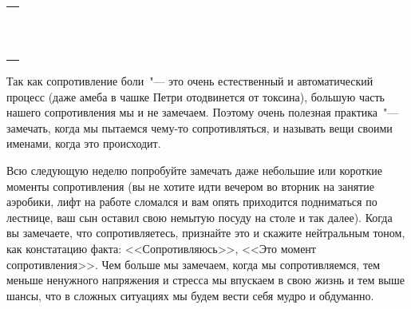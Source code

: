 \setlength{\extrarowheight}{2mm}
\begin{tabularx}{0.96\textwidth}{X}
	\\
	\arrayrulecolor{gray}\hline\\
	\hline\\
	\hline\\
	\hline\\
	\hline\\
	\hline\\
	\hline\\
	\hline\\
	\hline\\
	\hline\\
	\hline\\
	\hline\\
\end{tabularx}
\setlength{\extrarowheight}{0mm} 


 \label{IP:Noticing_Resistance}

Так как сопротивление боли~"--- это очень естественный и автоматический процесс (даже амеба в чашке Петри отодвинется от токсина), большую часть нашего сопротивления мы и не замечаем. Поэтому очень полезная практика~"---  замечать, когда мы пытаемся чему-то сопротивляться, и называть вещи своими именами, когда это происходит. 

Всю следующую неделю попробуйте замечать даже небольшие или короткие моменты сопротивления (вы не хотите идти вечером во вторник на занятие аэробики, лифт на работе сломался и вам опять приходится подниматься по лестнице, ваш сын оставил свою немытую посуду на столе и так далее). Когда вы замечаете, что сопротивляетесь, признайте это и скажите нейтральным тоном, как констатацию факта: <<Сопротивляюсь>>, <<Это момент сопротивления>>. Чем больше мы замечаем, когда мы сопротивляемся, тем меньше ненужного напряжения и стресса мы впускаем в свою жизнь и тем выше шансы, что в сложных ситуациях мы будем вести себя мудро и обдуманно.